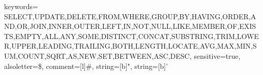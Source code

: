 \usepackage{color}
\usepackage{listings}
{
keywords=
  {SELECT,UPDATE,DELETE,FROM,WHERE,GROUP,BY,HAVING,ORDER,AND,OR,JOIN,INNER,OUTER,LEFT,IN,NOT,NULL,LIKE,MEMBER,OF,EXISTS,EMPTY,ALL,ANY,SOME,DISTINCT,CONCAT,SUBSTRING,TRIM,LOWER,UPPER,LEADING,TRAILING,BOTH,LENGTH,LOCATE,AVG,MAX,MIN,SUM,COUNT,SQRT,AS,NEW,SET,BETWEEN,ASC,DESC},%
sensitive=true,%
alsoletter={\$},%
comment=[l]{\#},%
string=[b]",%
string=[b]'%
}

